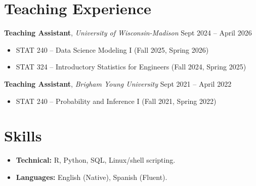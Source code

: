 \documentclass[11pt, letterpaper]{article}
\begin{document}
\section{Teaching Experience}
\textbf{Teaching Assistant}, \textit{University of Wisconsin-Madison} \hfill Sept 2024 -- April 2026
\begin{itemize}
    \item STAT 240 -- Data Science Modeling I (Fall 2025, Spring 2026)
    \item STAT 324 -- Introductory Statistics for Engineers (Fall 2024, Spring 2025)
\end{itemize}

\vspace{4pt}
\textbf{Teaching Assistant}, \textit{Brigham Young University} \hfill Sept 2021 -- April 2022
\begin{itemize}
    \item STAT 240 -- Probability and Inference I (Fall 2021, Spring 2022)
\end{itemize}


\section{Skills}
\begin{itemize}
    \item \textbf{Technical:} R, Python, SQL, Linux/shell scripting.
    \item \textbf{Languages:} English (Native), Spanish (Fluent).
\end{itemize}
\end{document}
